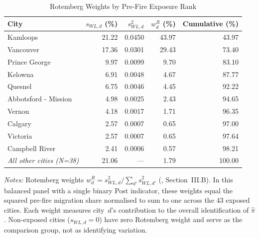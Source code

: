 \begin{table}[htbp]
  \caption{Rotemberg Weights by Pre-Fire Exposure Rank}
  \label{tab:rotemberg}
  \centering\small
  \begin{threeparttable}
  \begin{tabular}{lrrrr}
    \toprule
    City & $s_{WL,d}$ (\%) & $s_{WL,d}^2$ & $w_d^R$ (\%) & Cumulative (\%) \\
    \midrule
    Kamloops & 21.22 & 0.0450 & 43.97 & 43.97 \\
    Vancouver & 17.36 & 0.0301 & 29.43 & 73.40 \\
    Prince George & 9.97 & 0.0099 & 9.70 & 83.10 \\
    Kelowna & 6.91 & 0.0048 & 4.67 & 87.77 \\
    Quesnel & 6.75 & 0.0046 & 4.45 & 92.22 \\
    Abbotsford - Mission & 4.98 & 0.0025 & 2.43 & 94.65 \\
    Vernon & 4.18 & 0.0017 & 1.71 & 96.35 \\
    Calgary & 2.57 & 0.0007 & 0.65 & 97.00 \\
    Victoria & 2.57 & 0.0007 & 0.65 & 97.64 \\
    Campbell River & 2.41 & 0.0006 & 0.57 & 98.21 \\
    \addlinespace
    \textit{All other cities (N=38)} & 21.06 & --- & 1.79 & 100.00 \\
    \bottomrule
  \end{tabular}
  \begin{tablenotes}[flushleft]\footnotesize
    \item \textit{Notes:} Rotemberg weights $w_d^R = s_{WL,d}^2 / \sum_{d'} s_{WL,d'}^2$ (\citealt{goldsmith2020}, Section~III.B). In this balanced panel with a single binary Post indicator, these weights equal the squared pre-fire migration share normalised to sum to one across the 43 exposed cities. Each weight measures city~$d$'s contribution to the overall identification of $\hat{\pi}$. Non-exposed cities ($s_{WL,d}=0$) have zero Rotemberg weight and serve as the comparison group, not as identifying variation.
  \end{tablenotes}
  \end{threeparttable}
\end{table}

